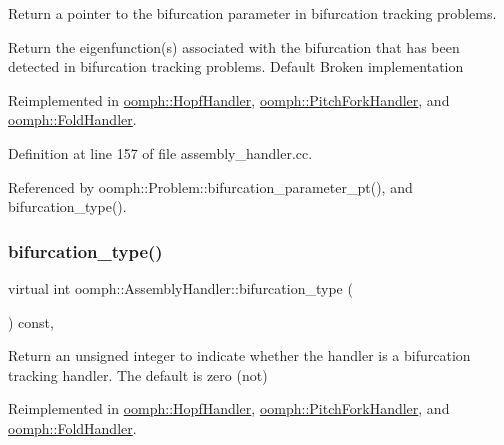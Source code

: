 Return a pointer to the bifurcation parameter in bifurcation tracking problems. 

Return the eigenfunction(s) associated with the bifurcation that has been detected in bifurcation tracking problems. Default Broken implementation 

Reimplemented in \hyperlink{classoomph_1_1HopfHandler_a49f4d0a78ac46ea1412d71d3bb9cc6a1}{oomph\+::\+Hopf\+Handler}, \hyperlink{classoomph_1_1PitchForkHandler_a7363cb34d716d64d891af5018e09d807}{oomph\+::\+Pitch\+Fork\+Handler}, and \hyperlink{classoomph_1_1FoldHandler_a0e35268f1b13aa94739aaaaa366f4586}{oomph\+::\+Fold\+Handler}.



Definition at line 157 of file assembly\+\_\+handler.\+cc.



Referenced by oomph\+::\+Problem\+::bifurcation\+\_\+parameter\+\_\+pt(), and bifurcation\+\_\+type().

\mbox{\label{classoomph_1_1AssemblyHandler_a22c5f240674e4f6cee12006790c11dae}} 
\subsubsection{\texorpdfstring{bifurcation\+\_\+type()}{bifurcation\_type()}}
{\footnotesize\ttfamily virtual int oomph\+::\+Assembly\+Handler\+::bifurcation\+\_\+type (\begin{DoxyParamCaption}{ }\end{DoxyParamCaption}) const\hspace{0.3cm}{\ttfamily [inline]}, {\ttfamily [virtual]}}



Return an unsigned integer to indicate whether the handler is a bifurcation tracking handler. The default is zero (not) 



Reimplemented in \hyperlink{classoomph_1_1HopfHandler_a789de82e82adaac82b366bbaa7f7ce59}{oomph\+::\+Hopf\+Handler}, \hyperlink{classoomph_1_1PitchForkHandler_aadc4f0b5dfb82cf171b91432536d1679}{oomph\+::\+Pitch\+Fork\+Handler}, and \hyperlink{classoomph_1_1FoldHandler_adb2878f53be92ea2be6cc012cbfc27ba}{oomph\+::\+Fold\+Handler}.



